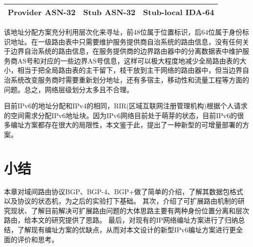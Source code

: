 \begin{itemize}
\begin{itemize}
\begin{table}[h]
\begin{tabular}{|c|c|c|}
        Provider ASN-32 & Stub ASN-32 & Stub-local IDA-64\\
        \hline
        \end{tabular}
    \end{table}
    该地址分配方案充分利用层次化来寻址，前48位属于位置标识，后64位属于身份标识地址。在一级路由表中只需要维护服务提供商自治系统的路由信息，没有任何关于边界自治系统的路由信息，在服务提供商的边界路由器中的分离数据表中维护服务商AS号和对应的一些边界AS号信息，这样可以极大程度地减少全局路由表的大小，相当于把全局路由表的主干留下，枝干放到主干网络的路由器中，但当边界自治系统改变服务商时需要重新划分地址，还有多宿主，移动性和流量工程等方面的问题。总之，网络层级划分太多且不合理。
    \end{itemize}

\end{itemize}

目前IPv6的地址分配和IPv4的相同，RIR(区域互联网注册管理机构)根据个人请求的空间需求分配IPv6地址块。因为IPv6网络目前处于萌芽的状态，目前IPv6的很多编址方案都存在很大的局限性，本文鉴于此，提出了一种新型的可增量部署的方案。

\section{小结}
本章对域间路由协议BGP、BGP-4、BGP+做了简单的介绍，了解其数据包格式以及协议的状态机，为之后的实验打下基础。
其次，介绍了可扩展路由机制的研究现状、了解目前解决可扩展路由问题的大体思路主要有两种身份位置分离和层次路由，给本文的研究提供了思路。
最后，对现有的IP网络编址方案进行了归纳总结，了解现有编址方案的优缺点，从而对本文设计的新型IPv6编址方案进行更全面的评价和思考。

